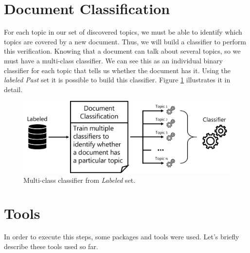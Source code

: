 \section{Document Classification}

For each topic in our set of discovered topics, we must be able to identify which topics are covered by a new document. Thus, we will build a classifier to perform this verification. Knowing that a document can talk about several topics, so we must have a multi-class classifier. We can see this as an individual binary classifier for each topic that tells us whether the document has it. Using the \textit{labeled Past} set it is possible to build this classifier. Figure \ref{fig:document-classification} illustrates it in detail.

\begin{figure}[h!]
	\centering
	\includegraphics[width=0.9\linewidth]{01.Chapters/04.Materials/document-classification}
	\caption{Multi-class classifier from \textit{Labeled} set.}
	\label{fig:document-classification}
\end{figure}


	
	




\section{Tools}

In order to execute this steps, some packages and tools were used. Let's briefly describe these tools used so far.


